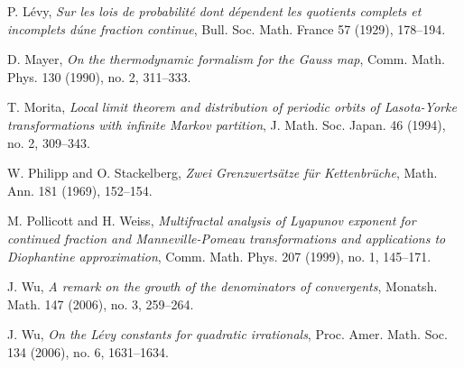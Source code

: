 \documentclass[reqno]{amsart}
\theoremstyle{definition}
\numberwithin{equation}{section}
\begin{document}
\begin{thebibliography}{10}
 P. L\'{e}vy, {\it Sur les lois de probabilit\'{e} dont d\'{e}pendent les quotients complets et incomplets d\'{u}ne fraction continue}, Bull. Soc. Math. France 57 (1929), 178--194.

 D. Mayer, {\it On the thermodynamic formalism for the Gauss map}, Comm. Math. Phys. 130 (1990), no. 2, 311--333.

 T. Morita, {\it Local limit theorem and distribution of periodic orbits of Lasota-Yorke transformations with infinite Markov partition}, J. Math. Soc. Japan. 46 (1994), no. 2, 309--343.

 W. Philipp and O. Stackelberg, {\it Zwei Grenzwerts\"{a}tze f\"{u}r Kettenbr\"{u}che}, Math. Ann. 181 (1969), 152--154.

 M. Pollicott and H. Weiss, {\it Multifractal analysis of Lyapunov exponent for continued fraction and Manneville-Pomeau transformations and applications to Diophantine approximation}, Comm. Math. Phys. 207 (1999), no. 1, 145--171.

 J. Wu, {\it A remark on the growth of the denominators of convergents}, Monatsh. Math. 147 (2006), no. 3, 259--264.

 J. Wu, {\it On the L\'{e}vy constants for quadratic irrationals}, Proc. Amer. Math. Soc. 134 (2006), no. 6, 1631--1634.
\end{thebibliography}
\end{document}
